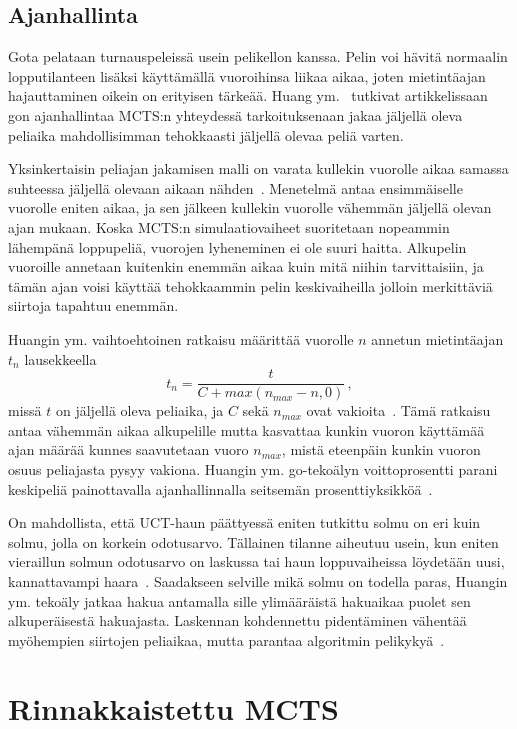 \documentclass[12pt,finnish]{tktltiki2}
\theoremstyle{definition}
\theoremstyle{remark}
\begin{document}
\subsection{Ajanhallinta}

Gota pelataan turnauspeleissä usein pelikellon kanssa. Pelin voi hävitä normaalin lopputilanteen lisäksi käyttämällä vuoroihinsa liikaa aikaa, joten mietintäajan hajauttaminen oikein on erityisen tärkeää. Huang ym.~\cite{huang} tutkivat artikkelissaan gon ajanhallintaa MCTS:n yhteydessä tarkoituksenaan jakaa jäljellä oleva peliaika mahdollisimman tehokkaasti jäljellä olevaa peliä varten.

Yksinkertaisin peliajan jakamisen malli on varata kullekin vuorolle aikaa samassa suhteessa jäljellä olevaan aikaan nähden~\cite{huang}. Menetelmä antaa ensimmäiselle vuorolle eniten aikaa, ja sen jälkeen kullekin vuorolle vähemmän jäljellä olevan ajan mukaan. Koska MCTS:n simulaatiovaiheet suoritetaan nopeammin lähempänä loppupeliä, vuorojen lyheneminen ei ole suuri haitta. Alkupelin vuoroille annetaan kuitenkin enemmän aikaa kuin mitä niihin tarvittaisiin, ja tämän ajan voisi käyttää tehokkaammin pelin keskivaiheilla jolloin merkittäviä siirtoja tapahtuu enemmän.

Huangin ym. vaihtoehtoinen ratkaisu määrittää vuorolle $n$ annetun mietintäajan $t_n$ lausekkeella
\begin{equation}
t_n = \frac{t}{C + max(n_{max} - n, 0)}\,,
\end{equation}
missä $t$ on jäljellä oleva peliaika, ja $C$ sekä $n_{max}$ ovat vakioita~\cite{huang}. Tämä ratkaisu antaa vähemmän aikaa alkupelille mutta kasvattaa kunkin vuoron käyttämää ajan määrää kunnes saavutetaan vuoro $n_{max}$, mistä eteenpäin kunkin vuoron osuus peliajasta pysyy vakiona. Huangin ym. go-tekoälyn voittoprosentti parani keskipeliä painottavalla ajanhallinnalla seitsemän prosenttiyksikköä~\cite{huang}.

On mahdollista, että UCT-haun päättyessä eniten tutkittu solmu on eri kuin solmu, jolla on korkein odotusarvo. Tällainen tilanne aiheutuu usein, kun eniten vieraillun solmun odotusarvo on laskussa tai haun loppuvaiheissa löydetään uusi, kannattavampi haara~\cite{huang}. Saadakseen selville mikä solmu on todella paras, Huangin ym. tekoäly jatkaa hakua antamalla sille ylimääräistä hakuaikaa puolet sen alkuperäisestä hakuajasta. Laskennan kohdennettu pidentäminen vähentää myöhempien siirtojen peliaikaa, mutta parantaa algoritmin pelikykyä~\cite{huang}.

\section{Rinnakkaistettu MCTS}
\end{document}

